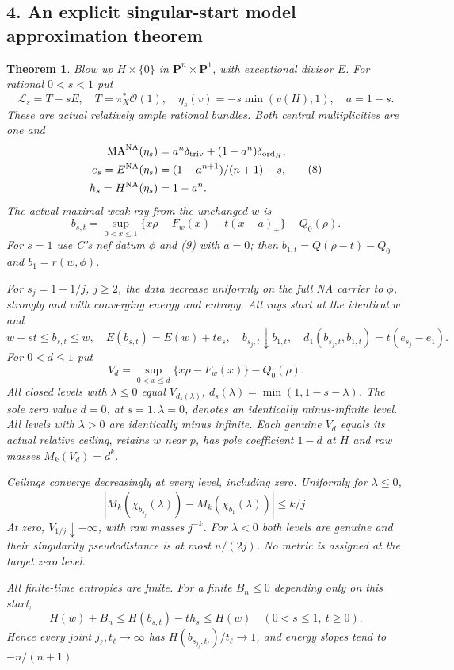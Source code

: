 \documentclass[
  11pt,
]{article}
\newtheorem{theorem}{Theorem}
\begin{document}
\subsection{4. An explicit singular-start model approximation
theorem}\label{an-explicit-singular-start-model-approximation-theorem}

\begin{theorem}\label{main}
Blow up $H\times\{0\}$ in $\mathbf P^n\times\mathbf P^1$, with
exceptional divisor $E$. For rational $0<s<1$ put
\[
\mathcal L_s=T-sE,\quad T=\pi_X^*\mathcal O(1),\quad
\eta_s(v)=-s\min(v(H),1),\quad a=1-s.
\tag{7}
\]
These are actual relatively ample rational bundles. Both central
multiplicities are one and
\[
\begin{split}
\operatorname{MA}^{\mathrm{NA}}(\eta_s)&=a^n\delta_{\rm triv}
 +(1-a^n)\delta_{\operatorname{ord}_H},\\
e_s=E^{\mathrm{NA}}(\eta_s)&=(1-a^{n+1})/(n+1)-s,\\
h_s=H^{\mathrm{NA}}(\eta_s)&=1-a^n.
\end{split}\tag{8}
\]
The actual maximal weak ray from the unchanged $w$ is
\[
b_{s,t}=\sup_{0<x\le1}\{x\rho-F_w(x)-t(x-a)_+\}-Q_0(\rho).
\tag{9}
\]
For $s=1$ use C's nef datum $\phi$ and (9) with $a=0$; then
$b_{1,t}=Q(\rho-t)-Q_0$ and $b_1=r(w,\phi)$.

For $s_j=1-1/j$, $j\ge2$, the data decrease uniformly on the full
NA carrier to $\phi$, strongly and with converging energy and
entropy. All rays start at the identical $w$ and
\[
w-st\le b_{s,t}\le w,\quad E(b_{s,t})=E(w)+te_s,\quad
b_{s_j,t}\downarrow b_{1,t},\quad
d_1(b_{s_j,t},b_{1,t})=t(e_{s_j}-e_1).
\tag{10}
\]
For $0<d\le1$ put
\[
V_d=\sup_{0<x\le d}\{x\rho-F_w(x)\}-Q_0(\rho).
\tag{11}
\]
All closed levels with $\lambda\le0$ equal
$V_{d_s(\lambda)}$, $d_s(\lambda)=\min(1,1-s-\lambda)$.
The sole zero value $d=0$, at $s=1,\lambda=0$, denotes an
identically minus-infinite level. All levels with $\lambda>0$
are identically minus infinite. Each genuine $V_d$ equals its
actual relative ceiling, retains $w$ near $p$, has pole coefficient
$1-d$ at $H$ and raw masses $M_k(V_d)=d^k$.

Ceilings converge decreasingly at every level, including zero.
Uniformly for $\lambda\le0$,
\[
|M_k(\chi_{b_{s_j}}(\lambda))-M_k(\chi_{b_1}(\lambda))|\le k/j.
\tag{12}
\]
At zero, $V_{1/j}\downarrow-\infty$, with raw masses $j^{-k}$.
For $\lambda<0$ both levels are genuine and their singularity
pseudodistance is at most $n/(2j)$. No metric is assigned at the
target zero level.

All finite-time entropies are finite. For a finite $B_n\le0$
depending only on this start,
\[
H(w)+B_n\le H(b_{s,t})-th_s\le H(w)
\quad(0<s\le1,\ t\ge0).
\tag{13}
\]
Hence every joint $j_\ell,t_\ell\to\infty$ has
$H(b_{s_{j_\ell},t_\ell})/t_\ell\to1$, and energy slopes tend
to $-n/(n+1)$.
\end{theorem}
\end{document}
